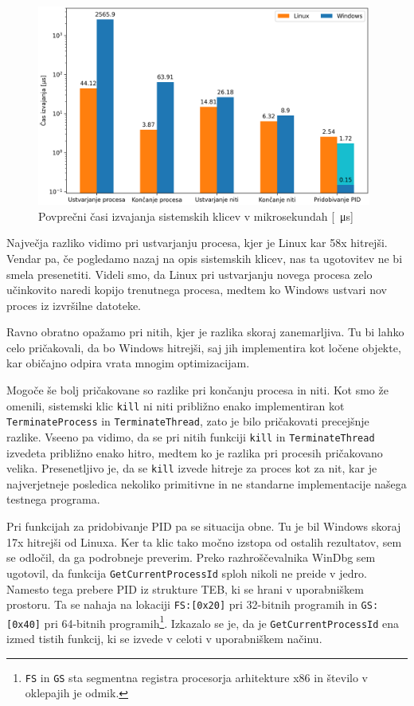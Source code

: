 \documentclass[a4paper,12pt,openright]{book}
\begin{document}
\begin{figure}[h!]
	\begin{center}
		\includegraphics[width=0.98\textwidth]{images/syscall_comparison_w5a.png}
	\end{center}
	\caption{Povprečni časi izvajanja sistemskih klicev v mikrosekundah [\SI{}{\micro\second}]}
	\label{fig:syscall_comparison:times}
\end{figure}

Največja razliko vidimo pri ustvarjanju procesa, kjer je Linux kar 58x hitrejši.
Vendar pa, če pogledamo nazaj na opis sistemskih klicev, nas ta ugotovitev ne bi smela presenetiti.
Videli smo, da Linux pri ustvarjanju novega procesa zelo učinkovito naredi kopijo trenutnega procesa, medtem ko Windows ustvari nov proces iz izvršilne datoteke.

Ravno obratno opažamo pri nitih, kjer je razlika skoraj zanemarljiva.
Tu bi lahko celo pričakovali, da bo Windows hitrejši, saj jih implementira kot ločene objekte, kar običajno odpira vrata mnogim optimizacijam.

Mogoče še bolj pričakovane so razlike pri končanju procesa in niti.
Kot smo že omenili, sistemski klic \texttt{kill} ni niti približno enako implementiran kot \texttt{TerminateProcess} in \texttt{TerminateThread}, zato je bilo pričakovati precejšnje razlike.
Vseeno pa vidimo, da se pri nitih funkciji \texttt{kill} in \texttt{TerminateThread} izvedeta približno enako hitro, medtem ko je razlika pri procesih pričakovano velika.
Presenetljivo je, da se \texttt{kill} izvede hitreje za proces kot za nit, kar je najverjetneje posledica nekoliko primitivne in ne standarne implementacije našega testnega programa.

Pri funkcijah za pridobivanje PID pa se situacija obne.
Tu je bil Windows skoraj 17x hitrejši od Linuxa.
Ker ta klic tako močno izstopa od ostalih rezultatov, sem se odločil, da ga podrobneje preverim.
Preko razhroščevalnika WinDbg sem ugotovil, da funkcija \texttt{GetCurrentProcessId} sploh nikoli ne preide v jedro.
Namesto tega prebere PID iz strukture TEB, ki se hrani v uporabniškem prostoru.
Ta se nahaja na lokaciji \texttt{FS:[0x20]} pri 32-bitnih programih in \texttt{GS:[0x40]} pri 64-bitnih programih\footnote{\texttt{FS} in \texttt{GS} sta segmentna registra procesorja arhitekture x86 in število v oklepajih je odmik.}.
Izkazalo se je, da je \texttt{GetCurrentProcessId} ena izmed tistih funkcij, ki se izvede v celoti v uporabniškem načinu.
\end{document}
